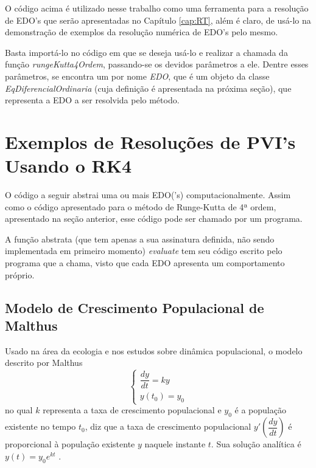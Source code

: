         O código acima é utilizado nesse trabalho como uma ferramenta para a resolução de EDO's que serão apresentadas no Capítulo \ref{cap:RT}, além é claro, de usá-lo na demonstração de exemplos da resolução numérica de EDO's pelo mesmo. 
        
        Basta importá-lo no código em que se deseja usá-lo e realizar a chamada da função \textit{rungeKutta4Ordem}, passando-se os devidos parâmetros a ele. Dentre esses parâmetros, se encontra um por nome \textit{EDO}, que é um objeto da classe \textit{EqDiferencialOrdinaria} (cuja definição é apresentada na próxima seção), que representa a EDO a ser resolvida pelo método.
        
    \section{Exemplos de Resoluções de PVI's Usando o RK4}
        O código a seguir abstrai uma ou mais EDO('s) computacionalmente. Assim como o código apresentado para o método de Runge-Kutta de 4ª ordem, apresentado na seção anterior, esse código pode ser chamado por um programa.
        
        
        
        A função abstrata (que tem apenas a sua assinatura definida, não sendo implementada em primeiro momento) \textit{evaluate} tem seu código escrito pelo programa que a chama, visto que cada EDO apresenta um comportamento próprio.
        
        \subsection{Modelo de Crescimento Populacional de Malthus}
        
            Usado na área da ecologia e nos estudos sobre dinâmica populacional, o modelo descrito por Malthus
            \begin{equation}
                \begin{cases}
                    \dfrac{dy}{dt} = ky\\
                    y(t_0) = y_0
                \end{cases}
            \end{equation}
            no qual $k$ representa a taxa de crescimento populacional e $y_0$ é a população existente no tempo $t_0$, diz que a taxa de crescimento populacional $y'(\dfrac{dy}{dt})$ é proporcional à população existente $y$ naquele instante $t$. Sua solução analítica é $y(t) = y_0e^{kt}$ \cite{regiIntro, Malthus}.
    
